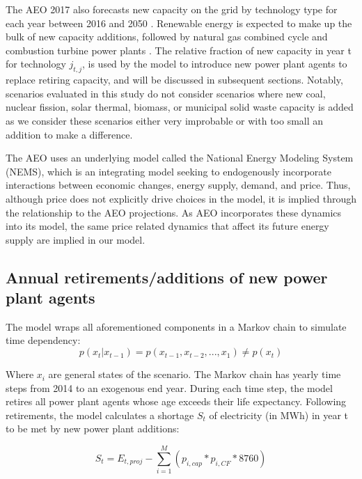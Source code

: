 \documentclass[review]{elsarticle}
\begin{document}
The AEO 2017 also forecasts new capacity on the grid by technology type for each year between 2016 and 2050 \citep{NEMS2014} . Renewable energy is expected to make up the bulk of new capacity additions, followed by natural gas combined cycle and combustion turbine power plants \citep{NEMS2014} . The relative fraction of new capacity in year t for technology $j_{t,j}$, is used by the model to introduce new power plant agents to replace retiring capacity, and will be discussed in subsequent sections. Notably, scenarios evaluated in this study do not consider scenarios where new coal, nuclear fission, solar thermal, biomass, or municipal solid waste capacity is added as we consider these scenarios either very improbable or with too small an addition to make a difference.

The AEO uses an underlying model called the National Energy Modeling System (NEMS), which is an integrating model seeking to endogenously incorporate interactions between economic changes, energy supply, demand, and price. Thus, although price does not explicitly drive choices in the model, it is implied through the relationship to the AEO projections. As AEO incorporates these dynamics into its model, the same price related dynamics that affect its future energy supply are implied in our model. 

\subsection{Annual retirements/additions of new power plant agents}

The model wraps all aforementioned components in a Markov chain to simulate time dependency: 
$$ p(x_t|x_{t-1})=p(x_{t-1},x_{t-2},...,x_1)\neq p(x_t)$$

Where $x_i$ are general states of the scenario. The Markov chain has yearly time steps from 2014 to an exogenous end year. During each time step, the model retires all power plant agents whose age exceeds their life expectancy. Following retirements, the model calculates a shortage $S_t$ of electricity (in MWh) in year t to be met by new power plant additions:

$$S_t=E_{t,proj}- \sum_{i=1}^M(p_{i,cap}*p_{i,CF}*8760)$$ 
\end{document}
